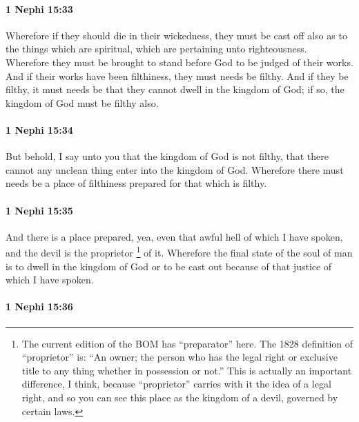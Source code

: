 		\paragraph{1 Nephi 15:33} %
			\label{1NEPHI-15-33}

			Wherefore if they should die in their wickedness,
			they must be cast off also as to the things which are spiritual,
			which are pertaining unto righteousness.
			Wherefore they must be brought to stand before God
			to be judged of their works.
			And if their works have been filthiness, they must needs be filthy.
			And if they be filthy, it must needs be
			that they cannot dwell in the kingdom of God;
			if so, the kingdom of God must be filthy also.

		\paragraph{1 Nephi 15:34} %
			\label{1NEPHI-15-34}

			But behold, I say unto you that the kingdom of God is not filthy,
			that there cannot any unclean thing enter into the kingdom of God.
			Wherefore there must needs be a place of filthiness
			prepared for that which is filthy.

		\paragraph{1 Nephi 15:35} %
			\label{1NEPHI-15-35}

			And there is a place prepared,
			yea, even that awful hell of which I have spoken,
			and the devil is the proprietor%
				\footnote{%
					\label{1NEPHI-15-35-NOTE-proprietor}%
					The current edition of the BOM has ``preparator'' here. The 1828 definition of ``proprietor'' is: ``An owner; the person who has the legal right or exclusive title to any thing whether in possession or not.'' This is actually an important difference, I think, because ``proprietor'' carries with it the idea of a legal right, and so you can see this place as the kingdom of a devil, governed by certain laws.
					}
			of it.
			Wherefore the final state of the soul of man
			is to dwell in the kingdom of God or to be cast out
			because of that justice of which I have spoken.

		\paragraph{1 Nephi 15:36} %
			\label{1NEPHI-15-36}

